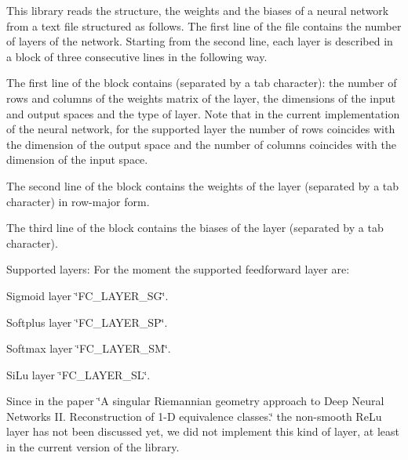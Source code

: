 This library reads the structure, the weights and the biases of a neural network from a text file structured as follows. The first line of the file contains the number of layers of the network. Starting from the second line, each layer is described in a block of three consecutive lines in the following way.
\begin{DoxyItemize}
\item The first line of the block contains (separated by a tab character)\+: the number of rows and columns of the weights matrix of the layer, the dimensions of the input and output spaces and the type of layer. Note that in the current implementation of the neural network, for the supported layer the number of rows coincides with the dimension of the output space and the number of columns coincides with the dimension of the input space.
\item The second line of the block contains the weights of the layer (separated by a tab character) in row-\/major form.
\item The third line of the block contains the biases of the layer (separated by a tab character).
\end{DoxyItemize}

Supported layers\+: For the moment the supported feedforward layer are\+:
\begin{DoxyItemize}
\item Sigmoid layer \char`\"{}\+F\+C\+\_\+\+L\+A\+Y\+E\+R\+\_\+\+S\+G\char`\"{}.
\item Softplus layer \char`\"{}\+F\+C\+\_\+\+L\+A\+Y\+E\+R\+\_\+\+S\+P\char`\"{}.
\item Softmax layer \char`\"{}\+F\+C\+\_\+\+L\+A\+Y\+E\+R\+\_\+\+S\+M\char`\"{}.
\item Si\+Lu layer \char`\"{}\+F\+C\+\_\+\+L\+A\+Y\+E\+R\+\_\+\+S\+L\char`\"{}.
\end{DoxyItemize}

Since in the paper \char`\"{}\+A singular Riemannian geometry approach to Deep Neural Networks I\+I. Reconstruction of 1-\/\+D equivalence classes.\char`\"{} the non-\/smooth Re\+Lu layer has not been discussed yet, we did not implement this kind of layer, at least in the current version of the library. 